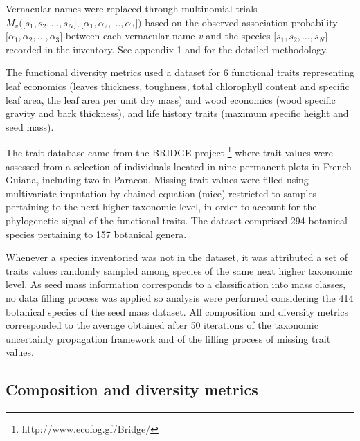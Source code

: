 \documentclass[fleqn,10pt]{ArtEcoFoG} %
\theoremstyle{definition}
\theoremstyle{definition}
\theoremstyle{definition}
\theoremstyle{remark}
\begin{document}
Vernacular names were replaced through multinomial trials
\(M_v\Big(\big[s_1, s_2, …, s_N\big],\big[\alpha_1, \alpha_2,…, \alpha_3\big]\Big)\)
based on the observed association probability
\(\big[\alpha_1, \alpha_2,…, \alpha_3\big]\) between each vernacular
name \emph{v} and the species \(\big[s_1, s_2, …, s_N\big]\) recorded in
the inventory. See appendix 1 and \citet{Aubry-Kientz2013} for the
detailed methodology.

The functional diversity metrics used a dataset for 6 functional traits
representing leaf economics (leaves thickness, toughness, total
chlorophyll content and specific leaf area, the leaf area per unit dry
mass) and wood economics (wood specific gravity and bark thickness), and
life history traits (maximum specific height and seed mass).

The trait database came from the BRIDGE project \footnote{http://www.ecofog.gf/Bridge/}
where trait values were assessed from a selection of individuals located
in nine permanent plots in French Guiana, including two in Paracou.
Missing trait values were filled using multivariate imputation by
chained equation (mice) restricted to samples pertaining to the next
higher taxonomic level, in order to account for the phylogenetic signal
of the functional traits. The dataset comprised 294 botanical species
pertaining to 157 botanical genera.

Whenever a species inventoried was not in the dataset, it was attributed
a set of traits values randomly sampled among species of the same next
higher taxonomic level. As seed mass information corresponds to a
classification into mass classes, no data filling process was applied so
analysis were performed considering the 414 botanical species of the
seed mass dataset. All composition and diversity metrics corresponded to
the average obtained after 50 iterations of the taxonomic uncertainty
propagation framework and of the filling process of missing trait
values.

\subsection{Composition and diversity
metrics}\label{composition-and-diversity-metrics}
\end{document}
